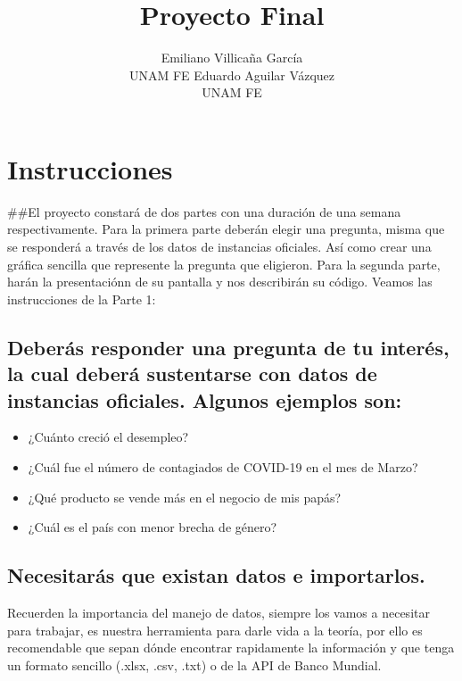 \documentclass[
]{jss}
\author{
Emiliano Villicaña García\\UNAM FE \And Eduardo Aguilar Vázquez\\UNAM FE
}
\title{Proyecto Final}
\begin{document}
\hypertarget{instrucciones}{%
\section{Instrucciones}\label{instrucciones}}

\#\#El proyecto constará de dos partes con una duración de una semana
respectivamente. Para la primera parte deberán elegir una pregunta,
misma que se responderá a través de los datos de instancias oficiales.
Así como crear una gráfica sencilla que represente la pregunta que
eligieron. Para la segunda parte, harán la presentaciónn de su pantalla
y nos describirán su código. Veamos las instrucciones de la Parte 1:

\hypertarget{deberuxe1s-responder-una-pregunta-de-tu-interuxe9s-la-cual-deberuxe1-sustentarse-con-datos-de-instancias-oficiales.-algunos-ejemplos-son}{%
\subsection{Deberás responder una pregunta de tu interés, la cual deberá
sustentarse con datos de instancias oficiales. Algunos ejemplos
son:}\label{deberuxe1s-responder-una-pregunta-de-tu-interuxe9s-la-cual-deberuxe1-sustentarse-con-datos-de-instancias-oficiales.-algunos-ejemplos-son}}

\begin{itemize}
\item ¿Cuánto creció el desempleo?
\item ¿Cuál fue el número de contagiados de COVID-19 en el mes de Marzo?
\item ¿Qué producto se vende más en el negocio de mis papás?
\item ¿Cuál es el país con menor brecha de género?
\end{itemize}

\hypertarget{necesitaruxe1s-que-existan-datos-e-importarlos.}{%
\subsection{Necesitarás que existan datos e
importarlos.}\label{necesitaruxe1s-que-existan-datos-e-importarlos.}}

Recuerden la importancia del manejo de datos, siempre los vamos a
necesitar para trabajar, es nuestra herramienta para darle vida a la
teoría, por ello es recomendable que sepan dónde encontrar rapidamente
la información y que tenga un formato sencillo (.xlsx, .csv, .txt) o de
la API de Banco Mundial.
\end{document}
